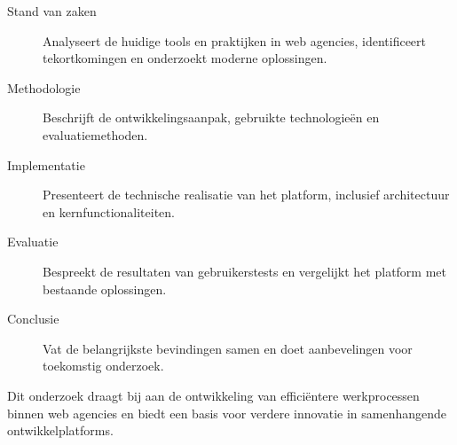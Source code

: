 \begin{description}
    \item[Stand van zaken] Analyseert de huidige tools en praktijken in web agencies, identificeert tekortkomingen en onderzoekt moderne oplossingen.
    
    \item[Methodologie] Beschrijft de ontwikkelingsaanpak, gebruikte technologieën en evaluatiemethoden.
    
    \item[Implementatie] Presenteert de technische realisatie van het platform, inclusief architectuur en kernfunctionaliteiten.
    
    \item[Evaluatie] Bespreekt de resultaten van gebruikerstests en vergelijkt het platform met bestaande oplossingen.
    
    \item[Conclusie] Vat de belangrijkste bevindingen samen en doet aanbevelingen voor toekomstig onderzoek.
\end{description}

Dit onderzoek draagt bij aan de ontwikkeling van efficiëntere werkprocessen binnen web agencies en biedt een basis voor verdere innovatie in samenhangende ontwikkelplatforms.